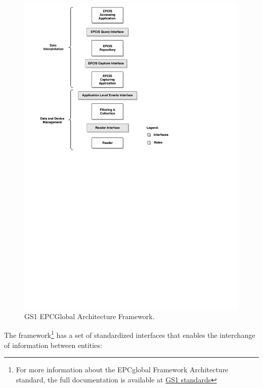 \begin{figure}[ht!]
  \centering
  \includegraphics[width=.8\textwidth]{./images/EPCGlobal_architecture}
  \caption{GS1 EPCGlobal Architecture Framework.}
  \label{fig:epc_architecture}
\end{figure}

The framework\footnote{For more information about the EPCglobal Framework Architecture standard, the
full documentation is available at \href{http://www.gs1.org/gs1-architecture}{GS1 standards}} has a
set of standardized interfaces that enables the interchange of information between entities:

